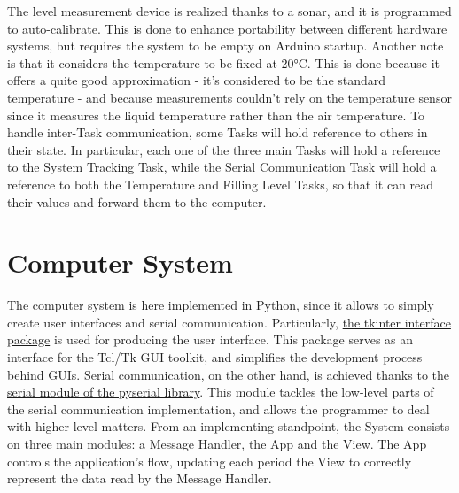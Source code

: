 \documentclass[a4paper,12pt]{report}
\begin{document}
	\newline The level measurement device is realized thanks to a sonar, and it is programmed to auto-calibrate. This is done to enhance portability between different hardware systems, but requires the system to be empty on Arduino startup. Another note is that it considers the temperature to be fixed at 20°C. This is done because it offers a quite good approximation - it's considered to be the standard temperature - and because measurements couldn't rely on the temperature sensor since it measures the liquid temperature rather than the air temperature.
	\newline To handle inter-Task communication, some Tasks will hold reference to others in their state. In particular, each one of the three main Tasks will hold a reference to the System Tracking Task, while the Serial Communication Task will hold a reference to both the Temperature and Filling Level Tasks, so that it can read their values and forward them to the computer.
	
	\section{Computer System}
	The computer system is here implemented in Python, since it allows to simply create user interfaces and serial communication.\newline
	Particularly, \href{https://docs.python.org/3/library/tkinter.html}{the tkinter interface package} is used for producing the user interface. This package serves as an interface for the Tcl/Tk GUI toolkit, and simplifies the development process behind GUIs.\newline
	Serial communication, on the other hand, is achieved thanks to \href{https://pyserial.readthedocs.io/en/latest/}{the serial module of the pyserial library}. This module tackles the low-level parts of the serial communication implementation, and allows the programmer to deal with higher level matters.\newline
	From an implementing standpoint, the System consists on three main modules: a Message Handler, the App and the View. The App controls the application's flow, updating each period the View to correctly represent the data read by the Message Handler.
\end{document}
